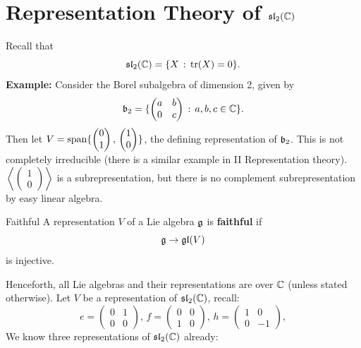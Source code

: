 \documentclass{article}
\begin{document}
\section{Representation Theory of $\mathfrak{sl}_{2}(\mathbb{C})$}
Recall that \[ \mathfrak{sl}_{2}(\mathbb{C}) = \{ X \, : \, \tr(X)=0 \}. \]
\textbf{Example: } Consider the Borel subalgebra of dimension 2, given by \[ \mathfrak{b}_{2} = \{ \begin{pmatrix} a & b \\ 0 & c \end{pmatrix} \, : \, a,b,c \in \mathbb{C} \}.\] Then let $V = \operatorname{span}\{\begin{pmatrix} 0 \\ 1 \end{pmatrix}, \, \begin{pmatrix}
    1 \\ 0
\end{pmatrix} \}$, the defining representation of $\mathfrak{b}_{2}$. This is not completely irreducible (there is a similar example in II Representation theory). $\left< \begin{pmatrix}
    1 \\ 0
\end{pmatrix} \right>$ is a subrepresentation, but there is no complement subrepresentation by easy linear algebra.
\begin{fancydefine}{Faithful} A representation $V$ of a Lie algebra $\mathfrak{g}$ is \textbf{faithful} if \[ \mathfrak{g} \to \mathfrak{gl}(V)\] is injective.
\end{fancydefine}
Henceforth, all Lie algebras and their representations are over $\mathbb{C}$ (unless stated otherwise). \gap Let $V$ be a representation of $\mathfrak{sl}_{2}(\mathbb{C})$, recall: \[e=\begin{pmatrix} 0 & 1 \\ 0 & 0 \end{pmatrix}, \, f= \begin{pmatrix}
    0 & 0\\
    1 & 0
\end{pmatrix}, \, h = \begin{pmatrix}
    1 & 0\\
    0 & -1
\end{pmatrix},\] 
We know three representations of $\mathfrak{sl}_{2}(\mathbb{C})$ already:\\
\end{document}
